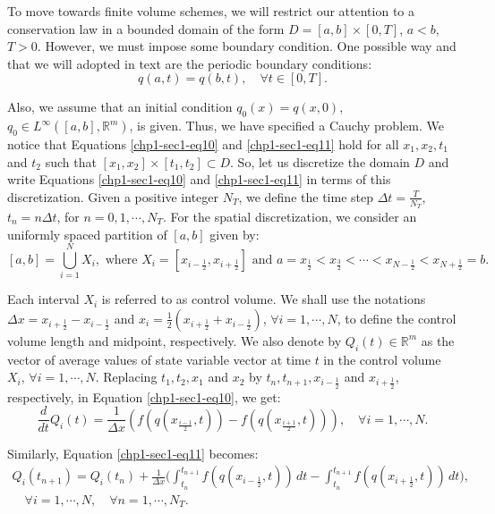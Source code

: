 To move towards finite volume schemes, we will restrict our attention
to a conservation law in a bounded domain of the form 
$D = [a,b]\times[0,T]$, $a<b$, $T>0$. However, we must 
impose some boundary condition. One possible way and that we will adopted 
in text are the periodic boundary conditions:
\begin{equation}
        \label{chp1-sec1-eq12}
	{q}(a, t) = {q}(b, t),\quad \forall t \in [0, T].
\end{equation}

Also, we assume that an initial condition $q_0(x) = q(x,0)$, $q_0 \in L^{\infty}([a,b],\mathbb{R}^m)$, is given.
Thus, we have specified a Cauchy problem.
We notice that Equations \eqref{chp1-sec1-eq10} and \eqref{chp1-sec1-eq11}
hold for all $x_1, x_2, t_1$ and $t_2$ such that
$[x_1, x_2] \times [t_1, t_2] \subset D$.
So, let us discretize the domain $D$ and write 
Equations \eqref{chp1-sec1-eq10} and \eqref{chp1-sec1-eq11} in terms of this discretization.
Given a positive integer $N_T$, we define the time step 
$\Delta t = \frac{T}{N_T}$, $t_n = n \Delta t$, for $n = 0, 1 ,\cdots, N_T$.
For the spatial discretization, we consider an uniformly spaced partition of $[a, b]$ given by: 
\begin{equation}
	\label{chp1-sec1-eq13}
	[a,b] = \bigcup_{i=1}^N X_i, 
	\text{ where } X_i= [x_{i-\frac{1}{2}}, x_{i+\frac{1}{2}}] \text{ and } 
	a = x_{\frac{1}{2}} < x_{\frac{3}{2}} < \cdots < x_{N-\frac{1}{2}} < x_{N+\frac{1}{2}} = b.
\end{equation}

Each interval $X_i$ is referred to as control volume. 
We shall use the notations $\Delta x = x_{i+\frac{1}{2}} - x_{i-\frac{1}{2}}$ 
and $x_i = \frac{1}{2}(x_{i+\frac{1}{2}} + x_{i-\frac{1}{2}})$, $\forall i = 1, \cdots, N$, 
to define the control volume length and midpoint, respectively.
We also denote by ${Q}_i(t) \in \mathbb{R}^m$ as the vector of 
average values of state variable vector at time $t$
in the control volume $X_i$, $\forall i = 1, \cdots, N$. Replacing $t_1, t_2, x_1$ and 
$x_2$ by $t_{n}, t_{n+1}, x_{i-\frac{1}{2}}$ and $x_{i+\frac{1}{2}}$,
respectively, in Equation \eqref{chp1-sec1-eq10}, we get:
\begin{equation}
        \label{chp1-sec1-eq14}
	\frac{d}{dt} {Q}_i(t) = \frac{1}{\Delta x}
	({f}({q}(x_{\frac{i-1}{2}},t)) -
	{f}({q}(x_{\frac{i+1}{2}},t))) ,
	\quad \forall i = 1, \cdots, N.
\end{equation}

Similarly, Equation \eqref{chp1-sec1-eq11} becomes:
\begin{equation}
        \label{chp1-sec1-eq15}
	\begin{aligned}
		{Q}_i(t_{n+1}) =  {Q}_i(t_n) +
		\frac{1}{\Delta x}\bigg( \int_{t_n}^{t_{n+1}}
        	{f}({q}(x_{i-\frac{1}{2}}, t)) \,dt -
		\int_{t_n}^{t_{n+1}}{f}({q}(x_{i+\frac{1}{2}}, t)) \,dt \bigg),
       		\\
		\quad \forall i = 1, \cdots, N,
		\quad \forall n = 1, \cdots, N_T.
	\end{aligned}
\end{equation}

